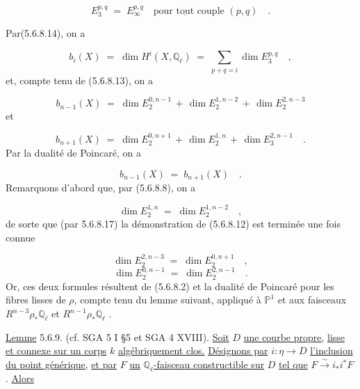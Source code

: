 \begin{equation}\tag{5.6.8.14}
E_3^{p,q} \;=\; E_\infty^{p,q} \quad \text{pour } \underline{\text{tout}} \text{ couple } (p,q) \quad .
\end{equation}


Par(5.6.8.14), on a

\begin{equation*}
b_i(X) \;=\; \dim H^i(X,\mathbb{Q}_\ell) \;=\; \sum_{p+q=i} \dim E_3^{p,q} \quad ,
\end{equation*}
et, compte tenu de (5.6.8.13), on a

\begin{equation}\tag{5.6.8.15}
b_{n-1}(X) \;=\; \dim E_2^{0,n-1} \,+\, \dim E_2^{1,n-2} \,+\, \dim E_2^{2,n-3}
\end{equation}
et

\begin{equation}\tag{5.6.8.16}
b_{n+1}(X) \;=\; \dim E_2^{0,n+1} \,+\, \dim E_2^{1,n} \,+\, \dim E_3^{2,n-1} \quad .
\end{equation}
Par la dualité de Poincaré, on a

\begin{equation}\tag{5.6.8.17}
b_{n-1}(X) \;=\; b_{n+1}(X) \quad .
\end{equation}
Remarquons d'abord que, par (5.6.8.8), on a

\begin{equation*}
\dim E_2^{1,n} \;=\; \dim E_2^{1,n-2} \quad ,
\end{equation*}
de sorte que (par 5.6.8.17) la démonstration de (5.6.8.12) est terminée une fois connue

\begin{equation}\tag{5.6.8.18}
\dim E_2^{2,n-3} \;=\; \dim E_2^{0,n+1} \quad ,
\end{equation}
\begin{equation}\tag{5.6.8.19}
\dim E_2^{0,n-1} \;=\; \dim E_2^{2,n-1} \quad .
\end{equation}
Or, ces deux formules résultent de (5.6.8.2) et la dualité de Poincaré pour les fibres lisses de $\rho$, compte tenu du lemme suivant, appliqué à $\mathbb{P}^1$ et aux faisceaux $R^{n-3}\rho_*\mathbb{Q}_\ell$ et $R^{n-1}\rho_*\mathbb{Q}_\ell$ .



\underline{Lemme} 5.6.9. (cf. SGA 5 I \S 5 et SGA 4 XVIII\quad ). \underline{Soit} $D$ \underline{une courbe propre,} \underline{lisse et connexe sur un corps} $k$ \underline{algébriquement clos.} \underline{Désignons par} $i : \eta \longrightarrow D$ \underline{l'inclusion du point générique,} \underline{et par} $F$ \underline{un} $\mathbb{Q}_\ell$\underline{-faisceau constructible sur} $D$ \underline{tel que} $F \overset{\sim}{\longrightarrow} i_*i^*F$ . \underline{Alors}

